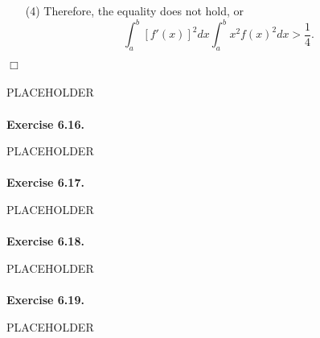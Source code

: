 \documentclass{article}
\begin{document}
\begin{enumerate}
  \item[(4)]
  Therefore, the equality does not hold, or
  \[
    \int_{a}^{b} [f'(x)]^2 dx \int_{a}^{b} x^2f(x)^2 dx > \frac{1}{4}.
  \]
\end{enumerate}
$\Box$ \\\\



PLACEHOLDER \\\\






\textbf{Exercise 6.16.}

PLACEHOLDER \\\\






\textbf{Exercise 6.17.}

PLACEHOLDER \\\\






\textbf{Exercise 6.18.}

PLACEHOLDER \\\\






\textbf{Exercise 6.19.}

PLACEHOLDER \\\\



\end{document}
